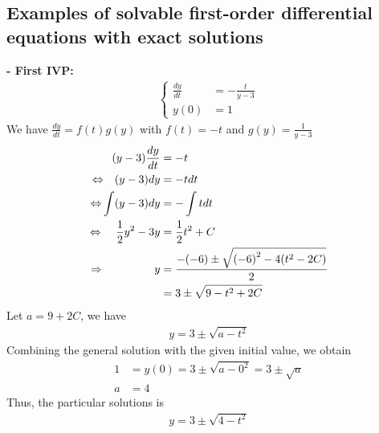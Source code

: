 \documentclass[a4paper]{article}
\numberwithin{equation}{section}
\begin{document}
\subsection{Examples of solvable first-order differential equations with exact solutions}
\textbf{- First IVP:}
\begin{align*}
  \begin{cases}
    \frac{dy}{dt} & = - \frac{t}{y - 3} \\
    y(0)          & = 1
  \end{cases}
\end{align*}
We have \( \frac{dy}{dt} = f(t)g(y) \) with \( f(t) = -t \) and \( g(y) = \frac{1}{y-3} \)
\begin{align*}
  (y - 3) \frac{dy}{dt}                                     & = -t                                                \\
  {\color{black}\Leftrightarrow} ~~~ (y - 3) dy             & = -t dt                                             \\
  {\color{black}\Leftrightarrow}  \int (y - 3) dy           & = -\int tdt                                         \\
  {\color{black}\Leftrightarrow} ~~~~ \frac {1}{2} y^2 - 3y & = \frac{1}{2} t^2 + C                               \\
  {\color{black}\Rightarrow} ~~~~~~~~~~~~~~ y               & = \frac{-(-6) \pm \sqrt{{(-6)}^2 - 4(t^2 - 2C)}}{2} \\
                                                            & = 3 \pm \sqrt{9 - t^2 + 2C}
\end{align*}
Let \( a = 9 + 2C \), we have
\begin{align*}
  y = 3 \pm \sqrt{a - t^2}
\end{align*}
Combining the general solution with the given initial value, we obtain
\begin{align*}
  1 & = y(0) = 3 \pm \sqrt{a - 0^2} = 3 \pm \sqrt{a} \\
  a & = 4
\end{align*}
Thus, the particular solutions is
\begin{align*}
  y = 3 \pm \sqrt{4-t^2}
\end{align*}
\end{document}
